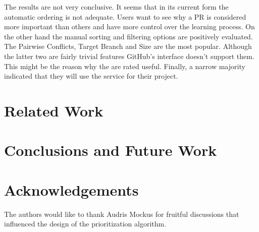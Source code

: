 \documentclass[conference]{IEEEtran}
\begin{document}
The results are not very conclusive.
It seems that in its current form the automatic ordering is not adequate.
Users want to see why a PR is considered more important than others and have more control over the learning process.
On the other hand the manual sorting and filtering options are positively evaluated.
The Pairwise Conflicts, Target Branch and Size are the most popular.
Although the latter two are fairly trivial features GitHub's interface doesn't support them.
This might be the reason why the are rated useful.
Finally, a narrow majority indicated that they will use the service for their project.

\section{Related Work}

\section{Conclusions and Future Work}

\section*{Acknowledgements} The authors would like to thank Audris Mockus for
fruitful discussions that influenced the design of the prioritization algorithm.



\end{document}
